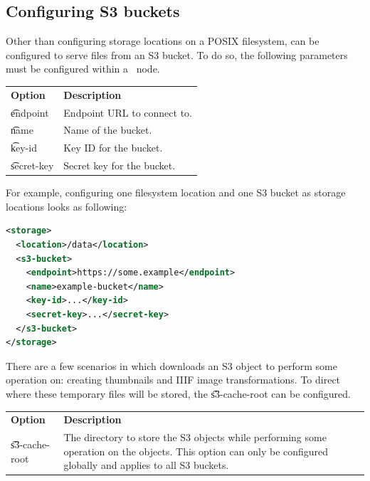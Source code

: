 \subsection{Configuring S3 buckets}
\label{sec:s3-buckets}

  Other than configuring storage locations on a POSIX filesystem,
   can be configured to serve files from an S3 bucket.
  To do so, the following parameters must be configured within a\
   node.

\begin{tabularx}{\textwidth}{*{1}{!{\VRule[-1pt]}l}!{\VRule[-1pt]}X}
  \headrow
  \textbf{Option}             & \textbf{Description}\\
  \t{endpoint}                & Endpoint URL to connect to.\\
  \t{name}                    & Name of the bucket.\\
  \t{key-id}                  & Key ID for the bucket.\\
  \t{secret-key}              & Secret key for the bucket.
\end{tabularx}

  For example, configuring one filesystem location and one S3 bucket
  as storage locations looks as following:

\begin{lstlisting}[language=xml]
<storage>
  <location>/data</location>
  <s3-bucket>
    <endpoint>https://some.example</endpoint>
    <name>example-bucket</name>
    <key-id>...</key-id>
    <secret-key>...</secret-key>
  </s3-bucket>
</storage>
\end{lstlisting}

  There are a few scenarios in which \code{djehuty} downloads an S3 object
  to perform some operation on: creating thumbnails and IIIF image
  transformations.  To direct where these temporary files will be stored,
  the \t{s3-cache-root} can be configured.

\begin{tabularx}{\textwidth}{*{1}{!{\VRule[-1pt]}l}!{\VRule[-1pt]}X}
  \headrow
  \textbf{Option}             & \textbf{Description}\\
  \t{s3-cache-root}           & The directory to store the S3 objects
                                while performing some operation on the
                                objects.  This option can only be configured
                                globally and applies to all S3 buckets.
\end{tabularx}


